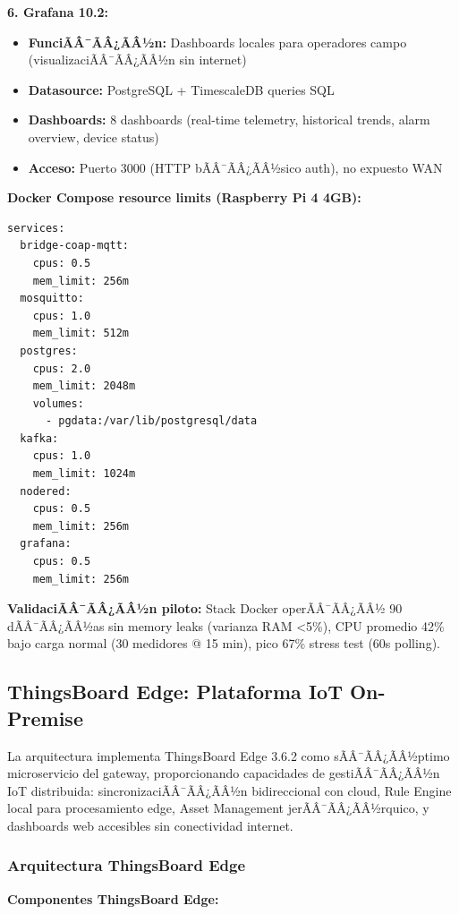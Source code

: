 \textbf{6. Grafana 10.2:}
\begin{itemize}
    \item \textbf{FunciÃÂ¯ÃÂ¿ÃÂ½n:} Dashboards locales para operadores campo (visualizaciÃÂ¯ÃÂ¿ÃÂ½n sin internet)
    \item \textbf{Datasource:} PostgreSQL + TimescaleDB queries SQL
    \item \textbf{Dashboards:} 8 dashboards (real-time telemetry, historical trends, alarm overview, device status)
    \item \textbf{Acceso:} Puerto 3000 (HTTP bÃÂ¯ÃÂ¿ÃÂ½sico auth), no expuesto WAN
\end{itemize}

\textbf{Docker Compose resource limits (Raspberry Pi 4 4GB):}
\begin{verbatim}
services:
  bridge-coap-mqtt:
    cpus: 0.5
    mem_limit: 256m
  mosquitto:
    cpus: 1.0
    mem_limit: 512m
  postgres:
    cpus: 2.0
    mem_limit: 2048m
    volumes:
      - pgdata:/var/lib/postgresql/data
  kafka:
    cpus: 1.0
    mem_limit: 1024m
  nodered:
    cpus: 0.5
    mem_limit: 256m
  grafana:
    cpus: 0.5
    mem_limit: 256m
\end{verbatim}

\textbf{ValidaciÃÂ¯ÃÂ¿ÃÂ½n piloto:} Stack Docker operÃÂ¯ÃÂ¿ÃÂ½ 90 dÃÂ¯ÃÂ¿ÃÂ½as sin memory leaks (varianza RAM <5\%), CPU promedio 42\% bajo carga normal (30 medidores @ 15 min), pico 67\% stress test (60s polling).

\subsection{ThingsBoard Edge: Plataforma IoT On-Premise}
\label{sec:impl-thingsboard-edge}

La arquitectura implementa ThingsBoard Edge 3.6.2 como sÃÂ¯ÃÂ¿ÃÂ½ptimo microservicio del gateway, proporcionando capacidades de gestiÃÂ¯ÃÂ¿ÃÂ½n IoT distribuida: sincronizaciÃÂ¯ÃÂ¿ÃÂ½n bidireccional con cloud, Rule Engine local para procesamiento edge, Asset Management jerÃÂ¯ÃÂ¿ÃÂ½rquico, y dashboards web accesibles sin conectividad internet.

\subsubsection{Arquitectura ThingsBoard Edge}

\textbf{Componentes ThingsBoard Edge:}

